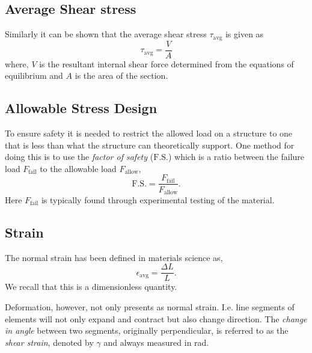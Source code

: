 
\subsection{Average Shear stress}
Similarly it can be shown that the average shear stress $\tau_{\mathrm{avg}}$ is given as
\[ 
\tau_{\mathrm{avg}} = \frac{V}{A}
\]
where, $V$ is the resultant internal shear force determined from the equations of equilibrium and $A$ is the area of the section. 


\subsection{Allowable Stress Design}
To ensure safety it is needed to restrict the allowed load on a structure to one that is less than what the structure can theoretically support. One method for doing this is to use the \textit{factor of safety} ($\mathrm{F.S.}$) which is a ratio between the failure load $F_{\mathrm{fail}}$ to the allowable load $F_{\mathrm{allow}}$,
\[ 
\mathrm{F.S.} = \frac{F_{\text{fail}}}{F_{\text{allow}}}
.\]
Here $F_{\text{fail}}$ is typically found through experimental testing of the material. 


\subsection{Strain}
The normal strain has been defined in materials science as,
\[ 
\epsilon_{\mathrm{avg}} = \frac{\Delta L}{L}
.\]
We recall that this is a dimensionless quantity.

Deformation, however, not only presents as normal strain. I.e. line segments of elements will not only expand and contract but also change direction. The \textit{change in angle} between two segments, originally perpendicular, is referred to as the \textit{shear strain}, denoted by $\gamma$ and always measured in \unit{rad}. 
